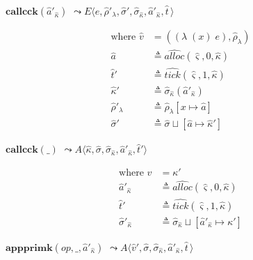 \documentclass[12pt,draft]{article}
\newcommand{\singlelamsyn}[2]{(\lambda\;(#1)\;#2)}
\begin{document}
\begin{multicols*}{2}
\vfill\null
\columnbreak


\begin{center}
  $\textbf{callcck}(\hat{a}'_{\hat{\kappa}})$
  $\leadsto E\langle e , \hat{\rho}'_{\lambda} , \hat{\sigma}' , \hat{\sigma}_{\hat{\kappa}} , \hat{a}'_{\hat{\kappa}} , \hat{t}\,\rangle$
\end{center}
\vspace{-7mm}
\begin{align*}
  \text{where }
  \hat{v} &= (\singlelamsyn{x}{e} , \hat{\rho}_{\lambda}) \\
  \hat{a} &\triangleq \widehat{alloc}(\hat{\varsigma}, 0, \hat{\kappa}) \\
  \hat{t}' &\triangleq \widehat{tick}(\hat{\varsigma}, 1, \hat{\kappa}) \\
  \hat{\kappa}' &\triangleq \hat{\sigma}_{\hat{\kappa}}(\hat{a}'_{\hat{\kappa}}) \\
  \hat{\rho}'_{\lambda} &\triangleq \hat{\rho}_{\lambda}[x \mapsto \hat{a}] \\
  \hat{\sigma}' &\triangleq \hat{\sigma} \sqcup [\hat{a} \mapsto \hat{\kappa}']
\end{align*}
\begin{center}
  $\textbf{callcck}(\_)$
  $\leadsto A\langle \hat{\kappa} , \hat{\sigma} , \hat{\sigma}_{\hat{\kappa}} , \hat{a}'_{\hat\kappa}  , \hat{t}'\rangle$
\end{center}
\vspace{-7mm}
\begin{align*}
\text{where } v &= \kappa' \\
  \hat{a}'_{\hat\kappa} &\triangleq \widehat{alloc}(\hat{\varsigma}, 0, \hat{\kappa}) \\
  \hat{t}' &\triangleq \widehat{tick}(\hat{\varsigma}, 1, \hat{\kappa}) \\
  \hat{\sigma}'_{\hat{\kappa}} &\triangleq \hat{\sigma}_{\hat{\kappa}} \sqcup [\hat{a}'_{\hat{\kappa}} \mapsto \kappa']
\end{align*}
\begin{center}
  $\textbf{appprimk}(op, \_, \hat{a}'_{\hat{\kappa}})$
  $\leadsto A\langle \hat{v}' , \hat{\sigma} , \hat{\sigma}_{\hat{\kappa}} , \hat{a}'_{\hat{\kappa}} , \hat{t}\,\rangle$

\end{center}
\end{multicols*}
\end{document}
